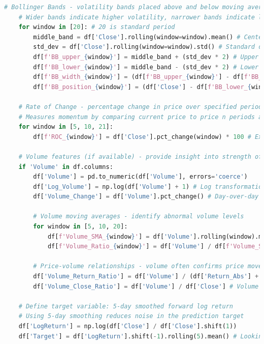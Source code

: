 \documentclass[12pt]{article}
\begin{document}
\begin{lstlisting}[language=Python]
    # Bollinger Bands - volatility bands placed above and below moving average
    # Wider bands indicate higher volatility, narrower bands indicate lower volatility
    for window in [20]: # 20 is standard period
        middle_band = df['Close'].rolling(window=window).mean() # Center band (20-day SMA)
        std_dev = df['Close'].rolling(window=window).std() # Standard deviation of price
        df[f'BB_upper_{window}'] = middle_band + (std_dev * 2) # Upper band (2 std devs above)
        df[f'BB_lower_{window}'] = middle_band - (std_dev * 2) # Lower band (2 std devs below)
        df[f'BB_width_{window}'] = (df[f'BB_upper_{window}'] - df[f'BB_lower_{window}']) / middle_band # Band width (volatility)
        df[f'BB_position_{window}'] = (df['Close'] - df[f'BB_lower_{window}']) / (df[f'BB_upper_{window}'] - df[f'BB_lower_{window}']) # Position within bands
    
    # Rate of Change - percentage change in price over specified periods
    # Measures momentum by comparing current price to price n periods ago
    for window in [5, 10, 21]:
        df[f'ROC_{window}'] = df['Close'].pct_change(window) * 100 # Expressed as percentage
    
    # Volume features (if available) - provide insight into strength of price movements
    if 'Volume' in df.columns:
        df['Volume'] = pd.to_numeric(df['Volume'], errors='coerce')
        df['Log_Volume'] = np.log(df['Volume'] + 1) # Log transformation for statistical properties
        df['Volume_Change'] = df['Volume'].pct_change() # Day-over-day volume change
        
        # Volume moving averages - identify abnormal volume levels
        for window in [5, 10, 20]:
            df[f'Volume_SMA_{window}'] = df['Volume'].rolling(window).mean()
            df[f'Volume_Ratio_{window}'] = df['Volume'] / df[f'Volume_SMA_{window}'] # Current volume relative to average
        
        # Price-volume relationships - volume often confirms price movements
        df['Volume_Return_Ratio'] = df['Volume'] / (df['Return_Abs'] + 0.001) # Avoid division by zero
        df['Volume_Close_Ratio'] = df['Volume'] / df['Close'] # Volume relative to price level

    # Define target variable: 5-day smoothed forward log return
    # Using 5-day smoothing reduces noise in the prediction target
    df['LogReturn'] = np.log(df['Close'] / df['Close'].shift(1))
    df['Target'] = df['LogReturn'].shift(-1).rolling(5).mean() # Looking ahead 1 day, smoothing over 5 days


\end{lstlisting}
\end{document}
